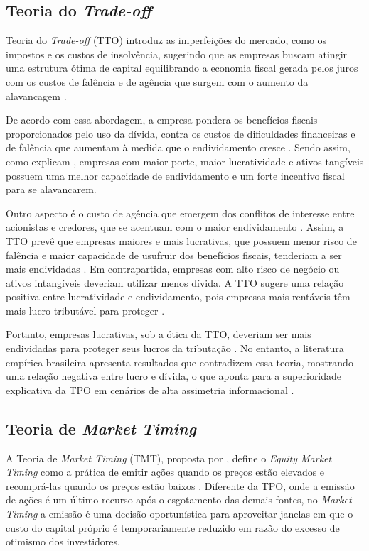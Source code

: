\documentclass[a4paper,12pt]{article}
\begin{document}
\subsection{Teoria do \textit{Trade-off}}

Teoria do \textit{Trade-off} (TTO) introduz as imperfeições do mercado, como os impostos e os custos de insolvência, sugerindo que as empresas buscam atingir uma estrutura ótima de capital equilibrando a economia fiscal gerada pelos juros com os custos de falência e de agência que surgem com o aumento da alavancagem \cite{Souza2024, brealey2020, david2007}. 

De acordo com essa abordagem, a empresa pondera os benefícios fiscais proporcionados pelo uso da dívida, contra os custos de dificuldades financeiras e de falência que aumentam à medida que o endividamento cresce \cite{Yildirim2021}. Sendo assim, como explicam , empresas com maior porte, maior lucratividade e ativos tangíveis possuem uma melhor capacidade de endividamento e um forte incentivo fiscal para se alavancarem.

Outro aspecto é o custo de agência que emergem dos conflitos de interesse entre acionistas e credores, que se acentuam com o maior endividamento \cite{jensen1976}. Assim, a TTO prevê que empresas maiores e mais lucrativas, que possuem menor risco de falência e maior capacidade de usufruir dos benefícios fiscais, tenderiam a ser mais endividadas \cite{Agyei2020}. Em contrapartida, empresas com alto risco de negócio ou ativos intangíveis deveriam utilizar menos dívida. A TTO sugere uma relação positiva entre lucratividade e endividamento, pois empresas mais rentáveis têm mais lucro tributável para proteger \cite{Souza2024}.

Portanto, empresas lucrativas, sob a ótica da TTO, deveriam ser mais endividadas para proteger seus lucros da tributação \cite{amaral2011}.  No entanto, a literatura empírica brasileira apresenta resultados que contradizem essa teoria, mostrando uma relação negativa entre lucro e dívida, o que aponta para a superioridade explicativa da TPO em cenários de alta assimetria informacional \cite{david2007, britto2018, Souza2024}.

\subsection{Teoria de \textit{Market Timing}}
 
A Teoria de \textit{Market Timing} (TMT), proposta por , define o \textit{Equity Market Timing} como a prática de emitir ações quando os preços estão elevados e recomprá-las quando os preços estão baixos \cite{baker2002}. Diferente da TPO, onde a emissão de ações é um último recurso após o esgotamento das demais fontes, no \textit{Market Timing} a emissão é uma decisão oportunística para aproveitar janelas em que o custo do capital próprio é temporariamente reduzido em razão do excesso de otimismo dos investidores.
 
\end{document}
